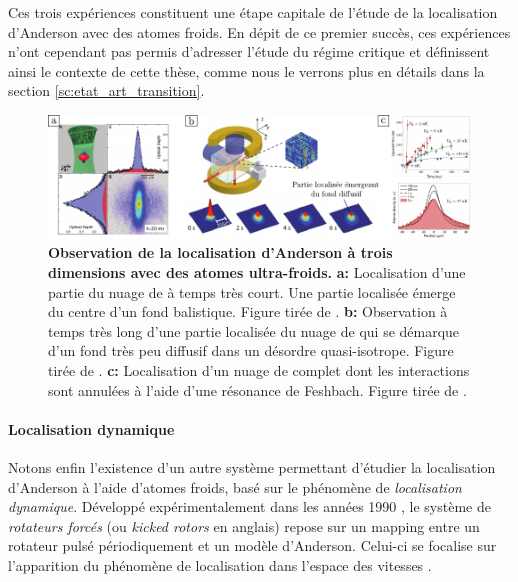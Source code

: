 Ces trois expériences constituent une étape capitale de l'étude de la localisation d'Anderson avec des atomes froids. En dépit de ce premier succès, ces expériences n'ont cependant pas permis d'adresser l'étude du régime critique et définissent ainsi le contexte de cette thèse, comme nous le verrons plus en détails dans la section \ref{sc:etat_art_transition}. 

\begin{figure}
\centering
\includegraphics[width=\textwidth]{Fig/Localisation/localisation_3D_atomes_v1.pdf}
\caption{\textbf{Observation de la localisation d'Anderson à trois dimensions avec des atomes ultra-froids.} \textbf{a:} Localisation d'une partie du nuage de  à temps très court. Une partie localisée émerge du centre d'un fond balistique. Figure tirée de \citep{kondov2011three}. \textbf{b:} Observation à temps très long d'une partie localisée du nuage de  qui se démarque d'un fond très peu diffusif dans un désordre quasi-isotrope. Figure tirée de \citep{jendrzejewski2012three}. \textbf{c:} Localisation d'un nuage de  complet dont les interactions sont annulées à l'aide d'une résonance de Feshbach. Figure tirée de \citep{semeghini2015measurement}.}
\label{fig:localisation_3D_atomes_froids}
\end{figure}





\paragraph*{Localisation dynamique}
Notons enfin l'existence d'un autre système permettant d'étudier la localisation d'Anderson à l'aide d'atomes froids, basé sur le phénomène de \emph{localisation dynamique}. Développé expérimentalement dans les années 1990 \citep{moore1995atom}, le système de \emph{rotateurs forcés} (ou \emph{kicked rotors} en anglais) repose sur un mapping entre un rotateur pulsé périodiquement et un modèle d'Anderson. Celui-ci se focalise sur l'apparition du phénomène de localisation dans l'espace des vitesses \citep{lemarietel-00424399}. 

